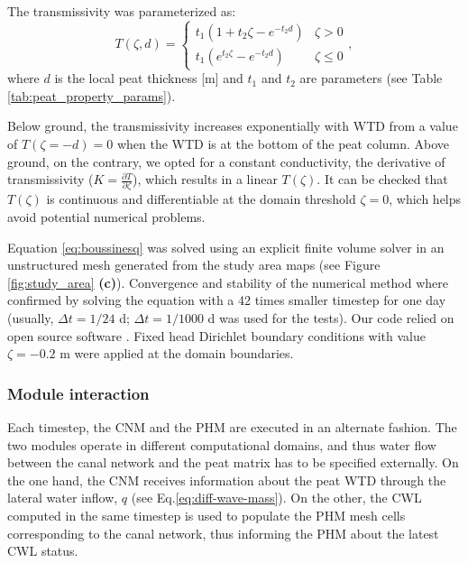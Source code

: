 \documentclass[bg, manuscript]{copernicus}
\begin{document}
The transmissivity was parameterized as:
\begin{equation} \label{eq:T_zeta}
T (\zeta, d) =
	\begin{cases}
         t_1 \left( 1 + t_2\zeta - e^{-t_2 d} \right) & \zeta > 0 \\
		 t_1(e^{t_2\zeta} - e^{-t_2 d}) & \zeta \leq 0
	\end{cases}
 ,
\end{equation}
where $d$ is the local peat thickness [\unit{m}] and $t_1$ and $t_2$ are parameters (see Table \ref{tab:peat_property_params}).

Below ground, the transmissivity increases exponentially with WTD from a value of $T(\zeta = -d)=0$ when the WTD is at the bottom of the peat column. 
Above ground, on the contrary, we opted for a constant conductivity, the derivative of transmissivity ($K = \frac{\partial T}{\partial \zeta}$), which results in a linear $T(\zeta)$.
It can be checked that $T(\zeta)$ is continuous and differentiable at the domain threshold $\zeta = 0$, which helps avoid potential numerical problems.

Equation \eqref{eq:boussinesq} was solved using an explicit finite volume solver in an unstructured mesh generated from the study area maps (see Figure \ref{fig:study_area} \textbf{(c)}).
Convergence and stability of the numerical method where confirmed by solving the equation with a 42 times smaller timestep for one day (usually, $\Delta t= 1/24$ \unit{d}; $\Delta t = 1/1000$ \unit{d} was used for the tests).
Our code relied on open source software \citep{guyerFiPyPartialDifferential2009, geuzaineGmshThreedimensionalFinite2009}.
Fixed head Dirichlet boundary conditions with value $\zeta = -0.2$ \unit{m} were applied at the domain boundaries.

\subsubsection{Module interaction}
Each timestep, the CNM and the PHM are executed in an alternate fashion.
The two modules operate in different computational domains, and thus water flow between the canal network and the peat matrix has to be specified externally.
On the one hand, the CNM receives information about the peat WTD through the lateral water inflow, $q$ (see Eq.\eqref{eq:diff-wave-mass}). 
On the other, the CWL computed in the same timestep is used to populate the PHM mesh cells corresponding to the canal network, thus informing the PHM about the latest CWL status.
\end{document}
